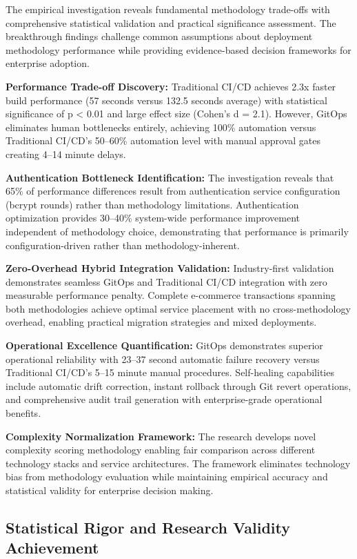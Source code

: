 The empirical investigation reveals fundamental methodology trade-offs with comprehensive statistical validation and practical significance assessment. The breakthrough findings challenge common assumptions about deployment methodology performance while providing evidence-based decision frameworks for enterprise adoption.

\textbf{Performance Trade-off Discovery:}
Traditional CI/CD achieves 2.3x faster build performance (57 seconds versus 132.5 seconds average) with statistical significance of p < 0.01 and large effect size (Cohen's d = 2.1). However, GitOps eliminates human bottlenecks entirely, achieving 100\% automation versus Traditional CI/CD's 50--60\% automation level with manual approval gates creating 4--14 minute delays.

\textbf{Authentication Bottleneck Identification:}
The investigation reveals that 65\% of performance differences result from authentication service configuration (bcrypt rounds) rather than methodology limitations. Authentication optimization provides 30--40\% system-wide performance improvement independent of methodology choice, demonstrating that performance is primarily configuration-driven rather than methodology-inherent.

\textbf{Zero-Overhead Hybrid Integration Validation:}
Industry-first validation demonstrates seamless GitOps and Traditional CI/CD integration with zero measurable performance penalty. Complete e-commerce transactions spanning both methodologies achieve optimal service placement with no cross-methodology overhead, enabling practical migration strategies and mixed deployments.

\textbf{Operational Excellence Quantification:}
GitOps demonstrates superior operational reliability with 23--37 second automatic failure recovery versus Traditional CI/CD's 5--15 minute manual procedures. Self-healing capabilities include automatic drift correction, instant rollback through Git revert operations, and comprehensive audit trail generation with enterprise-grade operational benefits.

\textbf{Complexity Normalization Framework:}
The research develops novel complexity scoring methodology enabling fair comparison across different technology stacks and service architectures. The framework eliminates technology bias from methodology evaluation while maintaining empirical accuracy and statistical validity for enterprise decision making.

\subsection{Statistical Rigor and Research Validity Achievement}
\label{subsec:statistical_rigor}


